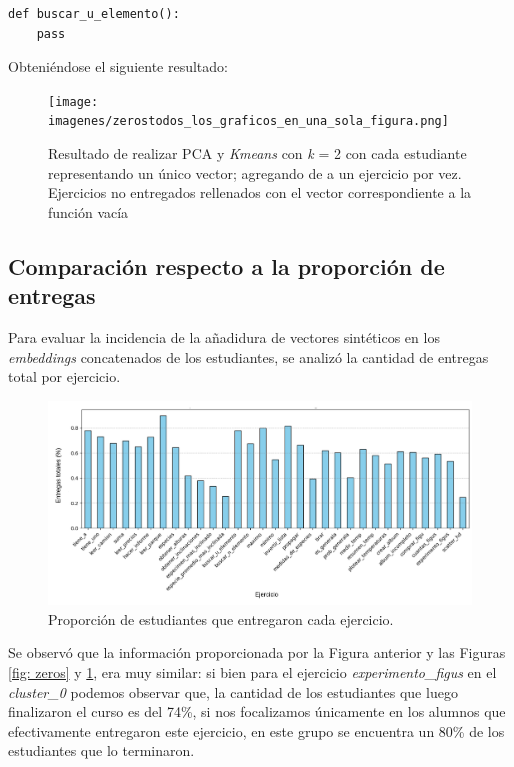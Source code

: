 \documentclass[11pt,a4paper,twoside,openany]{tesis}
\begin{document}
\begin{lstlisting}[style=pythonstyle]
def buscar_u_elemento():
    pass
\end{lstlisting}

Obteniéndose el siguiente resultado:

\begin{figure}[H]
    \centering
    \texttt{[image: imagenes/zerostodos\_los\_graficos\_en\_una\_sola\_figura.png]}
    \caption{Resultado de realizar PCA y \emph{Kmeans} con \emph{k} = 2 con cada estudiante representando un único vector; agregando de a un ejercicio por vez. Ejercicios no entregados rellenados con el vector correspondiente a la función vacía}
    \label{fig: fill func}
\end{figure}

\subsection{Comparación respecto a la proporción de entregas}

Para evaluar la incidencia de la añadidura de vectores sintéticos en los \emph{embeddings} concatenados de los estudiantes, se analizó la cantidad de entregas total por ejercicio.  

\begin{figure}[H]
    \centering
    \includegraphics[width=\textwidth]{imagenes/proporcion - entregas (1).png}
    \caption{Proporción de estudiantes que entregaron cada ejercicio.}
\end{figure}

Se observó que la información proporcionada por la Figura anterior y las Figuras \ref{fig: zeros} y \ref{fig: fill func}, era muy similar: si bien para el ejercicio \emph{experimento\_figus} en el \emph{cluster\_0} podemos observar que, la cantidad de los estudiantes que luego finalizaron el curso es del 74\%, si nos focalizamos únicamente en los alumnos que efectivamente entregaron este ejercicio, en este grupo se encuentra un 80\% de los estudiantes que lo terminaron. 
\end{document}
